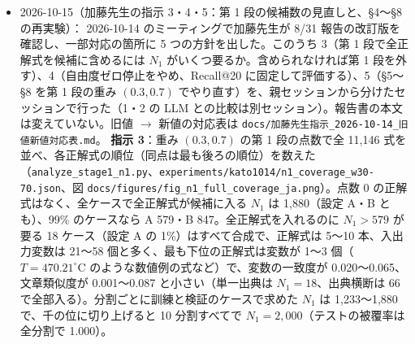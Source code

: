 \documentclass[11pt,a4paper]{jsarticle}
\begin{document}
\begin{itemize}[nosep]
    \textbf{本人の決定（2026-10-15、版 3）}：例題は渡さない（ゼロショット）。DB は分けずに 1 回で渡し、各式は ID・分野ラベル・式の表記（元のまま）だけをタブで区切って 1 行にする。出典は渡さず、式を乱数の種 20261015 で無作為に並べて ID を振り直した（\texttt{db\_ids\_v3.json}）。指示文には、課題、正解の式の組が満たす条件（Kato \& Kano, 2025 の要件 1〜3。8/31 報告 \S 2.1）、DB の読み方、答え方（最大 20 個、重要な順）を書いた。4 モデルとも effort は high、思考の要約を記録し、出力の上限は 32{,}000 トークン（ストリーミングで受ける）。例題がないので同じケースへの入力はどの分割でも同じになり、呼び出しは異なるテストケースごとに 1 回（10 分割で 1{,}665 回、3 分割で 1{,}204 回）とし、答えはそのケースがテストに入るすべての分割で使う。1 回の入力は最大 952{,}918 トークン（出力に 47{,}082 残る）。
    費用の見積もり（出力 2{,}000 トークン/回、キャッシュの書き込みを含む）：10 分割で Haiku 89、Sonnet 195、Opus 391、Fable 581 USD、3 分割で 64、142、284、423 USD。比較には、別セッションの新しい設定（提案手法 $N_1 = 2{,}000$・hard negative、baseline $(0.3, 0.7)$）の同じ分割の値も並べる。
    再現：\texttt{python3 run\_llm\_db\_baseline.py splits}（分割の固定）、\texttt{fix-order}（版 3 の並び）、\texttt{count3}（トークン数と費用）、承認後に \texttt{pilot3 --model ...}、\texttt{run3 --model ... --seeds ... --budget-usd ...}、\texttt{evaluate3 --model ...}。
  \item 2026-10-15（加藤先生の指示 3・4・5：第 1 段の候補数の見直しと、\S 4〜\S 8 の再実験）：
    2026-10-14 のミーティングで加藤先生が 8/31 報告の改訂版を確認し、一部対応の箇所に 5 つの方針を出した。このうち 3（第 1 段で全正解式を候補に含めるには $N_1$ がいくつ要るか。含められなければ第 1 段を外す）、4（自由度ゼロ停止をやめ、Recall@20 に固定して評価する）、5（\S 5〜\S 8 を第 1 段の重み $(0.3, 0.7)$ でやり直す）を、親セッションから分けたセッションで行った（1・2 の LLM との比較は別セッション）。報告書の本文は変えていない。旧値 $\to$ 新値の対応表は \texttt{docs/加藤先生指示\_2026-10-14\_旧値新値対応表.md}。
    \textbf{指示 3}：重み $(0.3, 0.7)$ の第 1 段の点数で全 11{,}146 式を並べ、各正解式の順位（同点は最も後ろの順位）を数えた（\texttt{analyze\_stage1\_n1.py}、\texttt{experiments/kato1014/n1\_coverage\_w30-70.json}、図 \texttt{docs/figures/fig\_n1\_full\_coverage\_ja.png}）。点数 0 の正解式はなく、全ケースで全正解式が候補に入る $N_1$ は 1{,}880（設定 A・B とも）、99\% のケースなら A 579・B 847。全正解式を入れるのに $N_1 > 579$ が要る 18 ケース（設定 A の 1\%）はすべて合成で、正解式は 5〜10 本、入出力変数は 21〜58 個と多く、最も下位の正解式は変数が 1〜3 個（$T = 470.21^\circ$C のような数値例の式など）で、変数の一致度が 0.020〜0.065、文章類似度が 0.001〜0.087 と小さい（単一出典は $N_1 = 18$、出典横断は 66 で全部入る）。分割ごとに訓練と検証のケースで求めた $N_1$ は 1{,}233〜1{,}880 で、千の位に切り上げると 10 分割すべてで $N_1 = 2{,}000$（テストの被覆率は全分割で 1.000）。

\end{itemize}
\end{document}
